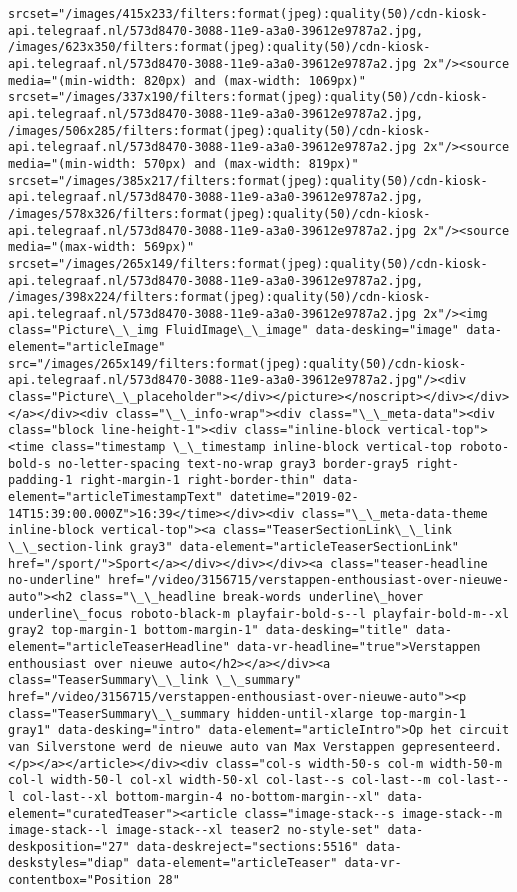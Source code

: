 \documentclass[11pt]{article}
\begin{document}
\begin{Verbatim}[commandchars=\\\{\}]
srcset="/images/415x233/filters:format(jpeg):quality(50)/cdn-kiosk-api.telegraaf.nl/573d8470-3088-11e9-a3a0-39612e9787a2.jpg, /images/623x350/filters:format(jpeg):quality(50)/cdn-kiosk-api.telegraaf.nl/573d8470-3088-11e9-a3a0-39612e9787a2.jpg 2x"/><source media="(min-width: 820px) and (max-width: 1069px)" srcset="/images/337x190/filters:format(jpeg):quality(50)/cdn-kiosk-api.telegraaf.nl/573d8470-3088-11e9-a3a0-39612e9787a2.jpg, /images/506x285/filters:format(jpeg):quality(50)/cdn-kiosk-api.telegraaf.nl/573d8470-3088-11e9-a3a0-39612e9787a2.jpg 2x"/><source media="(min-width: 570px) and (max-width: 819px)" srcset="/images/385x217/filters:format(jpeg):quality(50)/cdn-kiosk-api.telegraaf.nl/573d8470-3088-11e9-a3a0-39612e9787a2.jpg, /images/578x326/filters:format(jpeg):quality(50)/cdn-kiosk-api.telegraaf.nl/573d8470-3088-11e9-a3a0-39612e9787a2.jpg 2x"/><source media="(max-width: 569px)" srcset="/images/265x149/filters:format(jpeg):quality(50)/cdn-kiosk-api.telegraaf.nl/573d8470-3088-11e9-a3a0-39612e9787a2.jpg, /images/398x224/filters:format(jpeg):quality(50)/cdn-kiosk-api.telegraaf.nl/573d8470-3088-11e9-a3a0-39612e9787a2.jpg 2x"/><img class="Picture\_\_img FluidImage\_\_image" data-desking="image" data-element="articleImage" src="/images/265x149/filters:format(jpeg):quality(50)/cdn-kiosk-api.telegraaf.nl/573d8470-3088-11e9-a3a0-39612e9787a2.jpg"/><div class="Picture\_\_placeholder"></div></picture></noscript></div></div></a></div><div class="\_\_info-wrap"><div class="\_\_meta-data"><div class="block line-height-1"><div class="inline-block vertical-top"><time class="timestamp \_\_timestamp inline-block vertical-top roboto-bold-s no-letter-spacing text-no-wrap gray3 border-gray5 right-padding-1 right-margin-1 right-border-thin" data-element="articleTimestampText" datetime="2019-02-14T15:39:00.000Z">16:39</time></div><div class="\_\_meta-data-theme inline-block vertical-top"><a class="TeaserSectionLink\_\_link \_\_section-link gray3" data-element="articleTeaserSectionLink" href="/sport/">Sport</a></div></div></div><a class="teaser-headline no-underline" href="/video/3156715/verstappen-enthousiast-over-nieuwe-auto"><h2 class="\_\_headline break-words underline\_hover underline\_focus roboto-black-m playfair-bold-s--l playfair-bold-m--xl gray2 top-margin-1 bottom-margin-1" data-desking="title" data-element="articleTeaserHeadline" data-vr-headline="true">Verstappen enthousiast over nieuwe auto</h2></a></div><a class="TeaserSummary\_\_link \_\_summary" href="/video/3156715/verstappen-enthousiast-over-nieuwe-auto"><p class="TeaserSummary\_\_summary hidden-until-xlarge top-margin-1 gray1" data-desking="intro" data-element="articleIntro">Op het circuit van Silverstone werd de nieuwe auto van Max Verstappen gepresenteerd.</p></a></article></div><div class="col-s width-50-s col-m width-50-m col-l width-50-l col-xl width-50-xl col-last--s col-last--m col-last--l col-last--xl bottom-margin-4 no-bottom-margin--xl" data-element="curatedTeaser"><article class="image-stack--s image-stack--m image-stack--l image-stack--xl teaser2 no-style-set" data-deskposition="27" data-deskreject="sections:5516" data-deskstyles="diap" data-element="articleTeaser" data-vr-contentbox="Position 28" 
\end{Verbatim}
\end{document}
